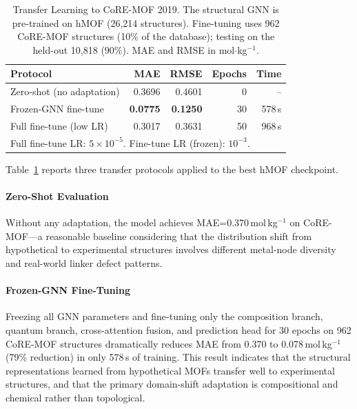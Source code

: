 \documentclass[conference]{IEEEtran}
\begin{document}
\begin{table}[!t]
\renewcommand{\arraystretch}{1.25}
\centering
\caption{Transfer Learning to CoRE-MOF 2019.
         The structural GNN is pre-trained on hMOF (26{,}214 structures).
         Fine-tuning uses 962 CoRE-MOF structures (10\% of the database);
         testing on the held-out 10{,}818 (90\%).
         MAE and RMSE in mol$\cdot$kg$^{-1}$.}
\label{tab:transfer}
\begin{tabular}{@{}lrrrr@{}}
\toprule
\textbf{Protocol} & \textbf{MAE} & \textbf{RMSE}
                  & \textbf{Epochs} & \textbf{Time}\\
\midrule
Zero-shot (no adaptation)    & 0.3696 & 0.4601 & 0  & --     \\
Frozen-GNN fine-tune         & \textbf{0.0775} & \textbf{0.1250} & 30 & 578\,s \\
Full fine-tune (low LR)      & 0.3017 & 0.3631 & 50 & 968\,s \\
\bottomrule
\multicolumn{5}{l}{\scriptsize Full fine-tune LR: $5\times10^{-5}$.
Fine-tune LR (frozen): $10^{-3}$.}\\
\end{tabular}
\end{table}

Table~\ref{tab:transfer} reports three transfer protocols applied to the
best hMOF checkpoint.

\paragraph{Zero-Shot Evaluation}
Without any adaptation, the model achieves MAE=0.370\,mol\,kg$^{-1}$
on CoRE-MOF—a reasonable baseline considering that the distribution shift
from hypothetical to experimental structures involves different metal-node
diversity and real-world linker defect patterns.

\paragraph{Frozen-GNN Fine-Tuning}
Freezing all GNN parameters and fine-tuning only the composition branch,
quantum branch, cross-attention fusion, and prediction head for 30 epochs on
962 CoRE-MOF structures dramatically reduces MAE from 0.370 to
0.078\,mol\,kg$^{-1}$ (79\% reduction) in only 578\,s of training.  This
result indicates that the structural representations learned from hypothetical
MOFs transfer well to experimental structures, and that the primary
domain-shift adaptation is compositional and chemical rather than
topological.
\end{document}
